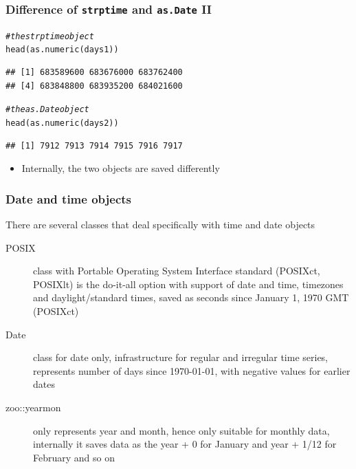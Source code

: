 \documentclass[xcolor=table, xcolor=dvipsnames]{beamer}\usepackage[]{graphicx}\usepackage[]{color}
\makeatletter
\newcommand{\hlcom}[1]{\textcolor[rgb]{0,0.392,0}{\textit{#1}}}
\newcommand{\hlstd}[1]{\textcolor[rgb]{0,0,0}{#1}}
\newcommand{\hlkwd}[1]{\textcolor[rgb]{0,0,1}{#1}}
\newenvironment{kframe}{%
 \def\at@end@of@kframe{}%
 \ifinner\ifhmode%
  \def\at@end@of@kframe{\end{minipage}}%
  \begin{minipage}{\columnwidth}%
 \fi\fi%
 \def\FrameCommand##1{\hskip\@totalleftmargin \hskip-\fboxsep
 \colorbox{shadecolor}{##1}\hskip-\fboxsep
     \hskip-\linewidth \hskip-\@totalleftmargin \hskip\columnwidth}%
 \MakeFramed {\advance\hsize-\width
   \@totalleftmargin\z@ \linewidth\hsize
   \@setminipage}}%
 {\par\unskip\endMakeFramed%
 \at@end@of@kframe}
\newenvironment{knitrout}{}{} %
\makeatother
\begin{document}

\begin{frame}[fragile]\frametitle{Difference of \texttt{strptime} and \texttt{as.Date} II}
\begin{knitrout}
\color{fgcolor}\begin{kframe}
\begin{alltt}
\hlcom{# the strptime object}
\hlkwd{head}\hlstd{(}\hlkwd{as.numeric}\hlstd{(days1))}
\end{alltt}
\begin{verbatim}
## [1] 683589600 683676000 683762400
## [4] 683848800 683935200 684021600
\end{verbatim}
\begin{alltt}
\hlcom{# the as.Date object}
\hlkwd{head}\hlstd{(}\hlkwd{as.numeric}\hlstd{(days2))}
\end{alltt}
\begin{verbatim}
## [1] 7912 7913 7914 7915 7916 7917
\end{verbatim}
\end{kframe}
\end{knitrout}
\begin{itemize}
\item Internally, the two objects are saved differently
\end{itemize}
\end{frame}


\begin{frame}[fragile]\frametitle{Date and time objects}
There are several classes that deal specifically with time and date objects
\begin{description}
\item[POSIX] class with Portable Operating System Interface standard (POSIXct, POSIXlt) is the do-it-all option with support of date and time, timezones and daylight/standard times, saved as seconds since  January 1, 1970 GMT (POSIXct)\\
\item[Date] class for date only, infrastructure for regular and irregular time series, represents number of days since 1970-01-01, with negative values for earlier dates\\
\item[zoo::yearmon] only represents year and month, hence only suitable for monthly data, internally it saves data as the year + 0 for January and  year + 1/12 for February and so on\\
\end{description}
\end{frame}
\end{document}
